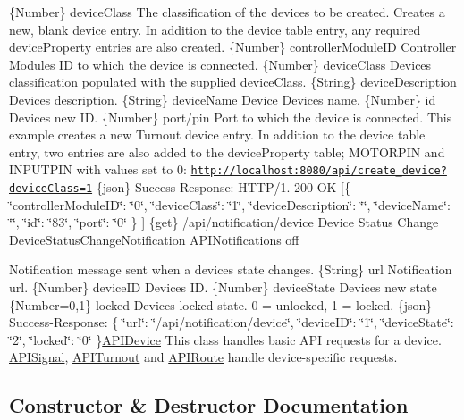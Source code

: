 \{Number\} device\+Class The classification of the device\textquotesingle{}s to be created.  Creates a new, blank device entry. In addition to the device table entry, any required device\+Property entries are also created.  \{Number\} controller\+Module\+ID Controller Module\textquotesingle{}s ID to which the device is connected.  \{Number\} device\+Class Device\textquotesingle{}s classification populated with the supplied device\+Class.  \{String\} device\+Description Device\textquotesingle{}s description.  \{String\} device\+Name Device Device\textquotesingle{}s name.  \{Number\} id Device\textquotesingle{}s new ID.  \{Number\} port/pin Port to which the device is connected.  This example creates a new Turnout device entry. In addition to the device table entry, two entries are also added to the device\+Property table; M\+O\+T\+O\+R\+P\+IN and I\+N\+P\+U\+T\+P\+IN with values set to 0\+: \href{http://localhost:8080/api/create_device?deviceClass=1}{\tt http\+://localhost\+:8080/api/create\+\_\+device?device\+Class=1}  \{json\} Success-\/\+Response\+: H\+T\+T\+P/1. 200 OK \mbox{[}\{ \char`\"{}controller\+Module\+I\+D\char`\"{}\+: \char`\"{}0\char`\"{}, \char`\"{}device\+Class\char`\"{}\+: \char`\"{}1\char`\"{}, \char`\"{}device\+Description\char`\"{}\+: \char`\"{}\char`\"{}, \char`\"{}device\+Name\char`\"{}\+: \char`\"{}\char`\"{}, \char`\"{}id\char`\"{}\+: \char`\"{}83\char`\"{}, \char`\"{}port\char`\"{}\+: \char`\"{}0\char`\"{} \} \mbox{]}  \{get\} /api/notification/device Device Status Change  Device\+Status\+Change\+Notification  A\+P\+I\+Notifications  off

Notification message sent when a device\textquotesingle{}s state changes.  \{String\} url Notification url.  \{Number\} device\+ID Device\textquotesingle{}s ID.  \{Number\} device\+State Device\textquotesingle{}s new state  \{Number=0,1\} locked Device\textquotesingle{}s locked state. 0 = unlocked, 1 = locked.  \{json\} Success-\/\+Response\+: \{ \char`\"{}url\char`\"{}\+: \char`\"{}/api/notification/device\char`\"{}, \char`\"{}device\+I\+D\char`\"{}\+: \char`\"{}1\char`\"{}, \char`\"{}device\+State\char`\"{}\+: \char`\"{}2\char`\"{}, \char`\"{}locked\char`\"{}\+: \char`\"{}0\char`\"{} \}\hyperlink{class_a_p_i_device}{A\+P\+I\+Device} This class handles basic A\+PI requests for a device. \hyperlink{class_a_p_i_signal}{A\+P\+I\+Signal}, \hyperlink{class_a_p_i_turnout}{A\+P\+I\+Turnout} and \hyperlink{class_a_p_i_route}{A\+P\+I\+Route} handle device-\/specific requests. 

\subsection{Constructor \& Destructor Documentation}
\mbox{\label{class_a_p_i_device_ab983034826edbff2b4246002b22081a5}} 
